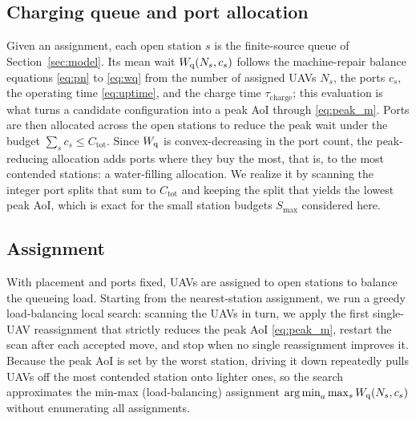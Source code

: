 \subsection{Charging queue and port allocation}
\label{subsec:port_block}
Given an assignment, each open station $s$ is the finite-source queue of
Section~\ref{sec:model}. Its mean wait $W_{\mathrm q}(N_s,c_s)$ follows the machine-repair
balance equations \eqref{eq:pn} to \eqref{eq:wq} from the number of assigned UAVs $N_s$,
the ports $c_s$, the operating time \eqref{eq:uptime}, and the charge time
$\tau_{\mathrm{charge}}$; this evaluation is what turns a candidate configuration
into a peak AoI through \eqref{eq:peak_m}. Ports are then allocated across the
open stations to reduce the peak wait under the budget
$\sum_s c_s\le C_{\mathrm{tot}}$. Since $W_{\mathrm q}$ is convex-decreasing in the port
count, the peak-reducing allocation adds ports where they buy the most, that is,
to the most contended stations: a water-filling allocation. We realize it by
scanning the integer port splits that sum to $C_{\mathrm{tot}}$ and keeping the
split that yields the lowest peak AoI, which is exact for the small station
budgets $S_{\max}$ considered here.

\subsection{Assignment}
\label{subsec:assign_block}
With placement and ports fixed, UAVs are assigned to open stations to balance the
queueing load. Starting from the nearest-station assignment, we run a greedy
load-balancing local search: scanning the UAVs in turn, we apply the first
single-UAV reassignment that strictly reduces the peak AoI \eqref{eq:peak_m},
restart the scan after each accepted move, and stop when no single reassignment
improves it. Because the peak AoI is set by the worst
station, driving it down repeatedly pulls UAVs off the most contended station
onto lighter ones, so the search approximates the min-max (load-balancing)
assignment $\operatorname*{arg\,min}_{a}\max_s W_{\mathrm q}(N_s,c_s)$ without enumerating all
assignments.


